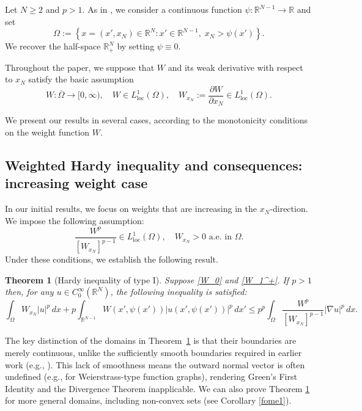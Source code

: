 \documentclass[12pt]{amsart}
\newtheorem{theorem}{Theorem}[section]
\theoremstyle{definition}
\theoremstyle{plain}
\begin{document}
Let $N \geq 2$ and $p > 1$. As 
in  \cite{Berestycki-Caffarelli-Nirenberg1, Berestycki-Caffarelli-Nirenberg2}, we consider a 
continuous function $\psi:\mathbb{R}^{N-1} \to \mathbb{R}$ and set
 	$$
	\Omega:=\left\{x=(x', x_N) \in \mathbb{R}^{N} : 
    x'\in \mathbb{R}^{N-1}, \;  x_N>\psi(x')\right\}.
	$$
We recover the half-space $\mathbb{R}^N_+$ by setting $\psi\equiv 0$. 

Throughout the paper, we suppose that $W$ and its weak derivative with respect to $x_N$ 
satisfy the basic assumption 
\begin{equation} \label{W_0} \tag{$W_0$} W:\overline{\Omega} \rightarrow [0,\infty), 
\quad W \in L^1_{\mathrm{loc}}(\Omega),\quad W_{x_N} := \frac{\partial W}{\partial x_N}  
\in L^1_{\mathrm{loc}}(\Omega). \end{equation}

We present our results in several cases, according to the monotonicity conditions on 
the weight function $W$.

\subsection{Weighted Hardy inequality and consequences: increasing weight case}

In our initial results, we focus on weights that are increasing in the $x_N$-direction. 
We impose the following assumption:
\begin{equation}\label{W_1^+}\tag{$W_1^+$}
\frac{W^p}{[W_{x_N}]^{p-1}} \in L^1_{\mathrm{loc}}(\Omega) ,\quad W_{x_N} > 0 
\text{ a.e. in } \Omega.\end{equation} 
Under these conditions, we establish the following result.

\begin{theorem}[Hardy inequality of type I] 
\label{Hardy-Grafico}
Suppose \eqref{W_0} and \eqref{W_1^+}. If $p>1$ then,  for any $u \in C_0^\infty(\mathbb{R}^N)$, the following inequality is satisfied:
\begin{equation}\label{Hardy-Geral-Grafico}
\int_{\Omega} W_{x_N} |u|^p \, dx 
+ p \int_{\mathbb{R}^{N-1}} W(x',\psi(x')) |u(x',\psi(x'))|^p \, dx' 
\leq p^p \int_{\Omega} \frac{W^p}{[W_{x_N}]^{p-1}} |\nabla u|^p \, dx.
\end{equation}
\end{theorem}

The key distinction of the domains in Theorem~\ref{Hardy-Grafico} is that their 
boundaries are merely continuous, unlike the sufficiently smooth boundaries required in 
earlier work (e.g., \cite[Lemma~2]{Lewis}). This lack of smoothness means the outward 
normal vector is often undefined (e.g., for Weierstrass-type function graphs), 
rendering Green's First Identity and the Divergence Theorem inapplicable. We can also 
prove Theorem \ref{Hardy-Grafico} for more general domains, including non-convex sets 
(see Corollary \ref{fome1}). 
\end{document}
